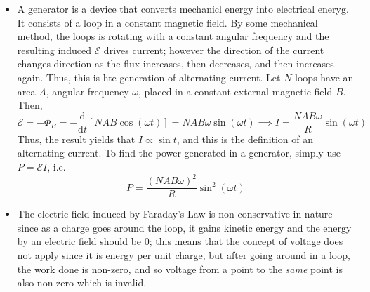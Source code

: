 \documentclass{scrartcl}
\begin{document}
\begin{itemize}
        \item A generator is a device that converts mechanicl energy into electrical eneryg. It consists of a loop in a constant magnetic field. By some mechanical method, the loops is rotating with a constant angular frequency and the resulting induced $\mathcal E$ drives current; however the direction of the current changes direction as the flux increases, then decreases, and then increases again. Thus, this is hte generation of alternating current. Let $N$ loops have an area $A$, angular frequency $\omega$, placed in a constant external magnetic field $B$. Then, \[\mathcal E=-\dot\Phi_B=-\frac{\mathrm d}{\mathrm dt}\left[NAB\cos\left(\omega t\right)\right]=NAB\omega\sin\left(\omega t\right)\implies\boxed{I=\frac{NAB\omega}R\sin\left(\omega t\right)}\] Thus, the result yields that $I\propto\sin t$, and this is the definition of an alternating current. To find the power generated in a generator, simply use $P=\mathcal EI$, i.e. \[\boxed{P=\frac{\left(NAB\omega\right)^2}R\sin^2\left(\omega t\right)}\]
        \item The electric field induced by Faraday's Law is non-conservative in nature since as a charge goes around the loop, it gains kinetic energy and the energy by an electric field should be 0; this means that the concept of voltage does not apply since it is energy per unit charge, but after going around in a loop, the work done is non-zero, and so voltage from a point to the \textit{same} point is also non-zero which is invalid.
    \end{itemize}
\end{document}
